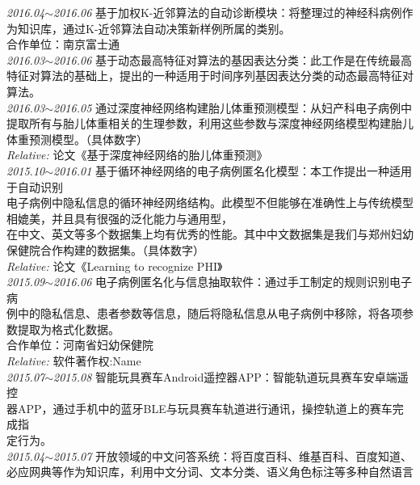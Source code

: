 \documentclass[line, margin]{res}
\newcommand{\xiaowu}{\fontsize{9pt}{15.75pt}\selectfont} %
\begin{document}
\begin{resume}
 { 
 {\sl 2016.04$\sim$2016.06} 基于加权K-近邻算法的自动诊断模块：{ 将整理过的神经科病例作\\
 为知识库，通过K-近邻算法自动决策新样例所属的类别。\\
 合作单位：南京富士通}\\
[7pt] 
 {\sl 2016.03$\sim$2016.06} 基于动态最高特征对算法的基因表达分类：{ 此工作是在传统最高\\
 特征对算法的基础上，提出的一种适用于时间序列基因表达分类的动态最高特征对\\
 算法。} \\
[7pt] 
 {\sl 2016.03$\sim$2016.05} 通过深度神经网络构建胎儿体重预测模型：{ 从妇产科电子病例中\\
 提取所有与胎儿体重相关的生理参数，利用这些参数与深度神经网络模型构建胎儿\\
 体重预测模型。（具体数字）} \\
 {\sl Relative:} {\xiaowu 论文《基于深度神经网络的胎儿体重预测》} \\
[7pt]
 {\sl 2015.10$\sim$2016.01} 基于循环神经网络的电子病例匿名化模型：{ 本工作提出一种适用于自动识别\\
 电子病例中隐私信息的循环神经网络结构。此模型不但能够在准确性上与传统模型相媲美，并且具有很强的泛化能力与通用型，\\
 在中文、英文等多个数据集上均有优秀的性能。其中中文数据集是我们与郑州妇幼保健院合作构建的数据集。（具体数字）} \\
 {\sl Relative:} {\xiaowu 论文《Learning to recognize PHI》}\\
[7pt] 
 {\sl 2015.09$\sim$2016.06} 电子病例匿名化与信息抽取软件：{ 通过手工制定的规则识别电子病\\
 例中的隐私信息、患者参数等信息，随后将隐私信息从电子病例中移除，将各项参数提取为格式化数据。\\
 合作单位：河南省妇幼保健院 } \\
 {\sl Relative:} {\xiaowu 软件著作权:Name} \\
[7pt]
 {\sl 2015.07$\sim$2015.08} 智能玩具赛车Android遥控器APP：{ 智能轨道玩具赛车安卓端遥控\\
 器APP，通过手机中的蓝牙BLE与玩具赛车轨道进行通讯，操控轨道上的赛车完成指\\
 定行为。}\\
[7pt]
 {\sl 2015.04$\sim$2015.07} 开放领域的中文问答系统：{ 将百度百科、维基百科、百度知道、\\
 必应网典等作为知识库，利用中文分词、文本分类、语义角色标注等多种自然语言\\
}}
\end{resume}
\end{document}
